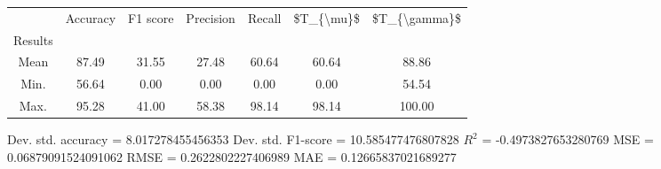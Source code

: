 \begin{tabular}{|c|c|c|c|c|c|c|}
\toprule
{} &  Accuracy &  F1 score &  Precision &  Recall &  \$T\_\{\textbackslash mu\}\$ &  \$T\_\{\textbackslash gamma\}\$ \\
Results &           &           &            &         &            &               \\
\hline
Mean    &     87.49 &     31.55 &      27.48 &   60.64 &      60.64 &         88.86 \\
Min.    &     56.64 &      0.00 &       0.00 &    0.00 &       0.00 &         54.54 \\
Max.    &     95.28 &     41.00 &      58.38 &   98.14 &      98.14 &        100.00 \\
\bottomrule
\end{tabular}

 Dev. std. accuracy = 8.017278455456353
 Dev. std. F1-score = 10.585477476807828
 $R^2$ = -0.4973827653280769
 MSE = 0.06879091524091062
 RMSE = 0.2622802227406989
 MAE = 0.12665837021689277